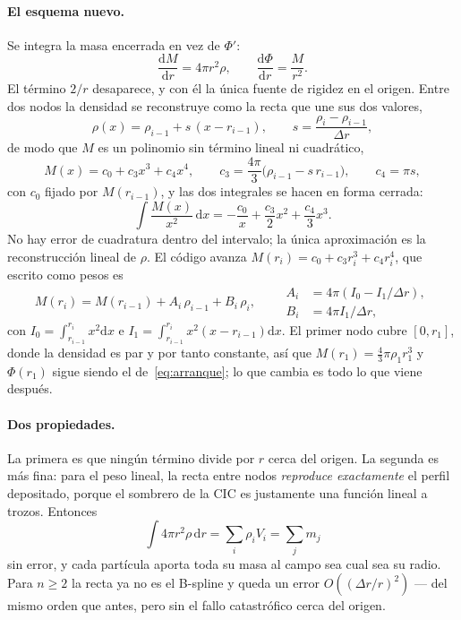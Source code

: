 \documentclass[11pt,a4paper]{article}
\newcommand{\dd}{\mathrm{d}}
\begin{document}
\paragraph{El esquema nuevo.} Se integra la masa encerrada en vez de $\Phi'$:
\begin{equation}
  \frac{\dd M}{\dd r}=4\pi r^{2}\rho ,\qquad
  \frac{\dd \Phi}{\dd r}=\frac{M}{r^{2}} .
  \label{eq:poisson_masa}
\end{equation}
El término $2/r$ desaparece, y con él la única fuente de rigidez en el origen. Entre dos
nodos la densidad se reconstruye como la recta que une sus dos valores,
\begin{equation}
  \rho(x)=\rho_{i-1}+s\,(x-r_{i-1}),\qquad s=\frac{\rho_i-\rho_{i-1}}{\Delta r},
\end{equation}
de modo que $M$ es un polinomio sin término lineal ni cuadrático,
\begin{equation}
  M(x)=c_0+c_3x^{3}+c_4x^{4},\qquad
  c_3=\frac{4\pi}{3}\big(\rho_{i-1}-s\,r_{i-1}\big),\qquad
  c_4=\pi s ,
\end{equation}
con $c_0$ fijado por $M(r_{i-1})$, y las dos integrales se hacen en forma cerrada:
\begin{equation}
  \int \frac{M(x)}{x^{2}}\,\dd x=-\frac{c_0}{x}+\frac{c_3}{2}x^{2}+\frac{c_4}{3}x^{3} .
\end{equation}
No hay error de cuadratura dentro del intervalo; la única aproximación es la
reconstrucción lineal de $\rho$. El código avanza $M(r_i)=c_0+c_3r_i^{3}+c_4r_i^{4}$, que
escrito como pesos es
\begin{equation}
  M(r_i)=M(r_{i-1})+A_i\,\rho_{i-1}+B_i\,\rho_i ,\qquad
  \begin{aligned}
    A_i&=4\pi\left(I_0-I_1/\Delta r\right),\\
    B_i&=4\pi I_1/\Delta r,
  \end{aligned}
  \label{eq:pesos_masa}
\end{equation}
con $I_0=\int_{r_{i-1}}^{r_i} x^{2}\dd x$ e $I_1=\int_{r_{i-1}}^{r_i}x^{2}(x-r_{i-1})\dd x$.
El primer nodo cubre $[0,r_1]$, donde la densidad es par y por tanto constante, así que
$M(r_1)=\tfrac43\pi\rho_1r_1^{3}$ y $\Phi(r_1)$ sigue siendo el de~\eqref{eq:arranque};
lo que cambia es todo lo que viene después.

\paragraph{Dos propiedades.} La primera es que ningún término divide por $r$ cerca del
origen. La segunda es más fina: para el peso lineal, la recta entre nodos
\emph{reproduce exactamente} el perfil depositado, porque el sombrero de la CIC es
justamente una función lineal a trozos. Entonces
\begin{equation}
  \int 4\pi r^{2}\rho\,\dd r=\sum_i \rho_i V_i=\sum_j m_j
\end{equation}
sin error, y cada partícula aporta toda su masa al campo sea cual sea su radio. Para
$n\ge2$ la recta ya no es el B-spline y queda un error $O((\Delta r/r)^{2})$ --- del
mismo orden que antes, pero sin el fallo catastrófico cerca del origen.
\end{document}
